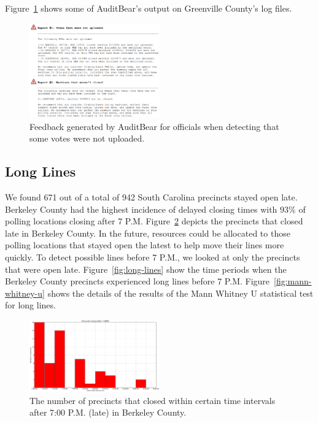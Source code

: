 \documentclass[letterpaper,twocolumn,10pt]{article}
\begin{document}
Figure~\ref{fig:greenville-logs} shows some of AuditBear's output on Greenville
County's log files. 

\begin{figure}[htbp]
\begin{center}
    \includegraphics[width=0.5\textwidth,height=0.3\textheight]{VotesNotUploaded.eps}
\end{center}
\caption{Feedback generated by AuditBear for officials when detecting that some votes were not uploaded.}
\label{fig:greenville-logs}
\end{figure}

\subsection{Long Lines}
We found 671 out of a total of 942 South Carolina precincts stayed open
late. Berkeley County had the highest incidence of delayed closing times with
$93\%$ of polling locations closing after 7
P.M\@. Figure~\ref{fig:precincts-closed-late} depicts the precincts 
that closed late in Berkeley County. In the future, resources could be allocated
to those polling locations that stayed open the latest to help move their lines
more quickly. To detect possible lines before 7 P.M., we looked at only the
precincts that were open late. Figure~\ref{fig:long-lines} show the time periods
when the Berkeley County precincts experienced long lines before 7
P.M. Figure~\ref{fig:mann-whitney-u} shows the details of the results of the
Mann Whitney U statistical test for long lines.

\begin{figure}[htbp]
\begin{center}
    \includegraphics[width=0.5\textwidth,height=0.3\textheight]{berkeleyopenlate.eps}
\end{center}
\caption{The number of precincts that closed within certain time intervals after 7:00 P.M. (late) in Berkeley County.}
\label{fig:precincts-closed-late}
\end{figure}
\end{document}
